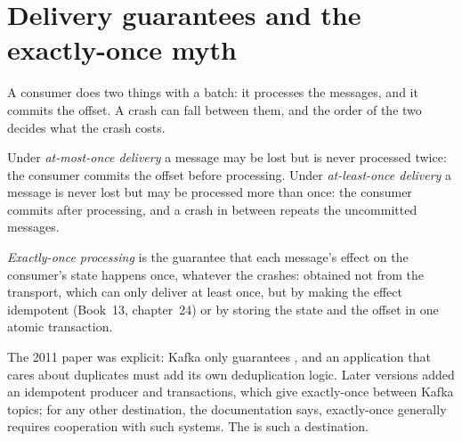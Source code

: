 \label{lst:pl:messaging-and-event-driven-architecture:append}

\section{Delivery guarantees and the exactly-once myth}

A consumer does two things with a batch: it processes the messages, and it commits the offset. A crash can fall between them, and the order
of the two decides what the crash costs.

\begin{definition}\label{def:pl:messaging-and-event-driven-architecture:delivery}
Under \emph{at-most-once delivery} a message may be lost but is never processed twice: the consumer commits the
offset before processing. Under \emph{at-least-once delivery} a message is never lost but may be processed more
than once: the consumer commits after processing, and a crash in between repeats the uncommitted messages.
\end{definition}

\begin{definition}\label{def:pl:messaging-and-event-driven-architecture:exactly}
\emph{Exactly-once processing} is the guarantee that each message's effect on the consumer's state happens
once, whatever the crashes: obtained not from the transport, which can only deliver at least once, but by making the effect idempotent
(Book~13, chapter~24) or by storing the state and the offset in one atomic transaction.
\end{definition}

The 2011 paper was explicit: \textquotedbl{}Kafka only guarantees \textquotedbl{}, and an application that cares about
duplicates \textquotedbl{}must add its own deduplication logic\textquotedbl{}. Later versions added an idempotent producer and transactions,
which give exactly-once between Kafka topics; for any other destination, the documentation says, exactly-once \textquotedbl{}generally
requires cooperation with such systems\textquotedbl{}. The  is such a destination.

